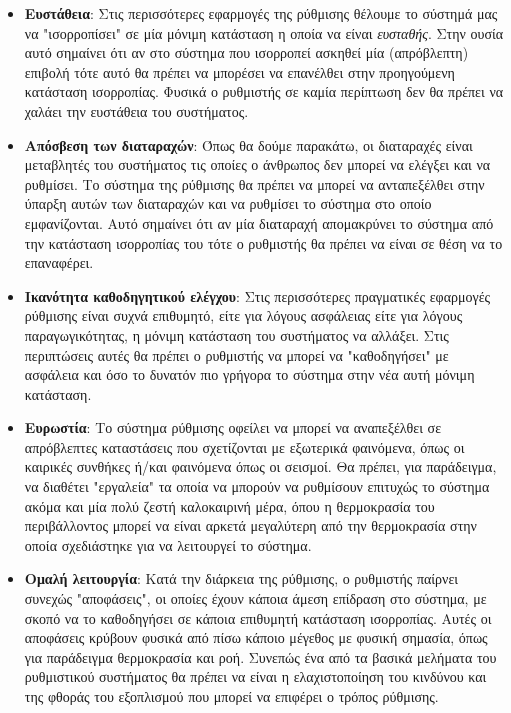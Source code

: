 \documentclass[11pt]{article} %
\numberwithin{equation}{subsection}
\begin{document}
\begin{itemize}
  \item \textbf{Ευστάθεια}: Στις περισσότερες εφαρμογές της ρύθμισης θέλουμε το σύστημά μας να "ισορροπίσει" σε μία μόνιμη κατάσταση η οποία να είναι \textit{ευσταθής}. Στην ουσία αυτό σημαίνει ότι αν στο σύστημα που ισορροπεί ασκηθεί μία (απρόβλεπτη) επιβολή τότε αυτό θα πρέπει να μπορέσει να επανέλθει στην προηγούμενη κατάσταση ισορροπίας. Φυσικά ο ρυθμιστής σε καμία περίπτωση δεν θα πρέπει να χαλάει την ευστάθεια του συστήματος. 
  \item \textbf{Απόσβεση των διαταραχών}: Όπως θα δούμε παρακάτω, οι διαταραχές είναι μεταβλητές του συστήματος τις οποίες ο άνθρωπος δεν μπορεί να ελέγξει και να ρυθμίσει. Το σύστημα της ρύθμισης θα πρέπει να μπορεί να ανταπεξέλθει στην ύπαρξη αυτών των διαταραχών και να ρυθμίσει το σύστημα στο οποίο εμφανίζονται. Αυτό σημαίνει ότι αν μία διαταραχή απομακρύνει το σύστημα από την κατάσταση ισορροπίας του τότε ο ρυθμιστής θα πρέπει να είναι σε θέση να το επαναφέρει.  
  \item \textbf{Ικανότητα καθοδηγητικού ελέγχου}: Στις περισσότερες πραγματικές εφαρμογές ρύθμισης είναι συχνά επιθυμητό, είτε για λόγους ασφάλειας είτε για λόγους παραγωγικότητας, η μόνιμη κατάσταση του συστήματος να αλλάξει. Στις περιπτώσεις αυτές θα πρέπει ο ρυθμιστής να μπορεί να "καθοδηγήσει" με ασφάλεια και όσο το δυνατόν πιο γρήγορα το σύστημα στην νέα αυτή μόνιμη κατάσταση. 
  \item \textbf{Ευρωστία}: Το σύστημα ρύθμισης οφείλει να μπορεί να αναπεξέλθει σε απρόβλεπτες καταστάσεις που σχετίζονται με εξωτερικά φαινόμενα, όπως οι καιρικές συνθήκες ή/και φαινόμενα όπως οι σεισμοί. Θα πρέπει, για παράδειγμα, να διαθέτει "εργαλεία" τα οποία να μπορούν να ρυθμίσουν επιτυχώς το σύστημα ακόμα και μία πολύ ζεστή καλοκαιρινή μέρα, όπου η θερμοκρασία του περιβάλλοντος μπορεί να είναι αρκετά μεγαλύτερη από την θερμοκρασία στην οποία σχεδιάστηκε για να λειτουργεί το σύστημα. 
  \item \textbf{Ομαλή λειτουργία}: Κατά την διάρκεια της ρύθμισης, ο ρυθμιστής παίρνει συνεχώς "αποφάσεις", οι οποίες έχουν κάποια άμεση επίδραση στο σύστημα, με σκοπό να το καθοδηγήσει σε κάποια επιθυμητή κατάσταση ισορροπίας. Αυτές οι αποφάσεις κρύβουν φυσικά από πίσω κάποιο μέγεθος με φυσική σημασία, όπως για παράδειγμα θερμοκρασία και ροή. Συνεπώς ένα  από τα βασικά μελήματα του ρυθμιστικού συστήματος θα πρέπει να είναι η ελαχιστοποίηση του κινδύνου και της φθοράς του εξοπλισμού που μπορεί να επιφέρει ο τρόπος ρύθμισης. 
\end{itemize}
\end{document}
